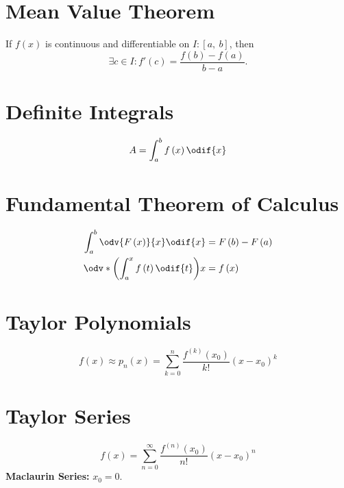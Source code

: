 \documentclass{article}
\begin{document}
\begin{multicols}{3}
    \section*{Mean Value Theorem}
    If \(f\left( x \right)\) is continuous and differentiable on \(I:\left[ a,\:b \right]\), then
    \begin{equation*}
        \exists c\in I:f'\left( c \right)=\frac{f\left( b \right)-f\left( a \right)}{b-a}.
    \end{equation*}
    \section*{Definite Integrals}
    \begin{equation*}
        A = \int_a^b f\left( x \right) \odif{x}
    \end{equation*}
    \section*{Fundamental Theorem of Calculus}
    \begin{align*}
        \int_a^b \odv{F\left( x \right)}{x} \odif{x}                 & = F\left( b \right) - F\left( a \right) \\
        \odv*{\left( \int_a^x f\left( t \right) \odif{t} \right)}{x} & = f\left( x \right)
    \end{align*}
    \section*{Taylor Polynomials}
    \begin{equation*}
        f\left( x \right) \approx p_n\left( x \right) = \sum_{k=0}^n \frac{f^{\left( k \right)}\left( x_0 \right)}{k!} \left( x-x_0 \right)^k
    \end{equation*}
    \section*{Taylor Series}
    \begin{equation*}
        f\left( x \right) = \sum_{n=0}^{\infty} \frac{f^{\left( n \right)}\left( x_0 \right)}{n!}\left( x-x_0 \right)^n
    \end{equation*}
    \textbf{Maclaurin Series:} \(x_0 = 0\).

\end{multicols}
\end{document}
